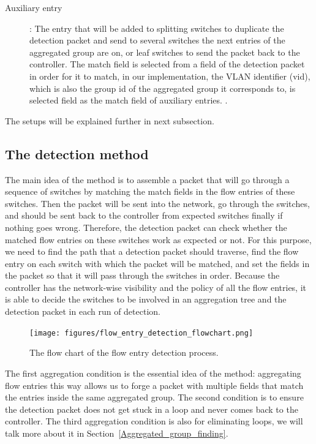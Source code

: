 \begin{description}
\item 
[Auxiliary entry]:
The entry that will be added to splitting switches to duplicate the detection packet and send to several \sout{} switches the next entries of the aggregated group are on, or leaf switches to send the packet back to the controller. The match field is selected from a field of the detection packet in order for it to match, in our implementation, the VLAN identifier (vid), which is also the group id of the aggregated group it corresponds to, is selected field as the match field of auxiliary entries. \sout{}.
\end{description}


The setups will be explained further in next subsection.

\subsection{The detection method}
\label{Detection_method}

The main idea of the method is to assemble a packet that will go through a sequence of switches by matching the match fields in the flow entries of these switches. Then the packet will be sent into the network, go through the switches, and should be sent back to the controller from expected switches finally if nothing goes wrong. Therefore, the detection packet can check whether the matched flow entries on these switches work as expected or not. For this purpose, we need to find the path that a detection packet should traverse, find the flow entry on each switch with which the packet will be matched, and set the fields in the packet so that it will pass through the switches in order. Because the controller has the network-wise visibility and the policy of all the flow entries, it is able to decide the switches to be involved in an aggregation tree and the detection packet in each run of detection. 

\begin{figure}[H]
\begin{center} 
\texttt{[image: figures/flow\_entry\_detection\_flowchart.png]}
\end{center}
\caption{The flow chart of the flow entry detection process.}
\label{flow_entry_detection_flowchart}
\end{figure}

The first aggregation condition is the essential idea of the method: aggregating flow entries this way allows us to forge a packet with multiple fields that match the entries inside the same aggregated group. The second condition is to ensure the detection packet does not get stuck in a loop and never comes back to the controller. The third aggregation condition is also for eliminating loops, we will talk more about it in Section~\ref{Aggregated_group_finding}.

